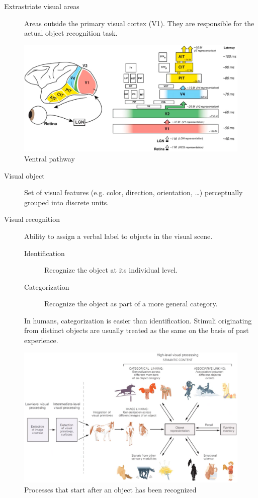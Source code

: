 \begin{description}
    \item[Extrastriate visual areas] Areas outside the primary visual cortex (V1).
        They are responsible for the actual object recognition task.
\end{description}

\begin{figure}[H]
    \centering
    \includegraphics[width=0.55\linewidth]{./img/ventral_pathway.png}
    \caption{Ventral pathway}
\end{figure}


\begin{description}
    \item[Visual object] 
        Set of visual features (e.g. color, direction, orientation, \dots) perceptually grouped into discrete units.

    \item[Visual recognition]
        Ability to assign a verbal label to objects in the visual scene.
        \begin{description}
            \item[Identification]  
                Recognize the object at its individual level.
            \item[Categorization]  
                Recognize the object as part of a more general category.
        \end{description}

        \begin{remark}
            In humans, categorization is easier than identification.
            Stimuli originating from distinct objects are usually treated as the same on the basis of past experience.

        \end{remark}
\end{description}

\begin{figure}[H]
    \centering
    \includegraphics[width=0.7\linewidth]{./img/object_recognition.png}
    \caption{Processes that start after an object has been recognized}
\end{figure}

